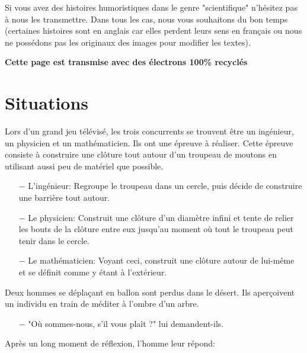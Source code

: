 Si vous avez des histoires humoristiques dans le genre "scientifique" n'hésitez pas à nous les transmettre. Dans tous les cas, nous vous souhaitons du bon temps (certaines histoires sont en anglais car elles perdent leurs sens en français ou nous ne possédons pas les originaux des images pour modifier les textes).
	
\begin{center}
\textbf{Cette page est transmise avec des électrons 100\% recyclés}
\end{center}

	\section{Situations}
	
	Lors d'un grand jeu télévisé, les trois concurrents se trouvent être un ingénieur, un physicien et un mathématicien. Ils ont une épreuve à réaliser. Cette épreuve consiste à construire une clôture tout autour d'un troupeau de moutons en utilisant aussi peu de matériel que possible.

\begin{itemize}	 
	\item[$-$] L'ingénieur: Regroupe le troupeau dans un cercle, puis décide de construire une barrière tout autour.

	\item[$-$] Le physicien: Construit une clôture d'un diamètre infini et tente de relier les bouts de la clôture entre eux jusqu'au moment où tout le troupeau peut tenir dans le cercle.

	\item[$-$] Le mathématicien: Voyant ceci, construit une clôture autour de lui-même et se définit comme y étant à l'extérieur.
\end{itemize}

\begin{center}\underline{\hspace{5 cm}}\end{center}

Deux hommes se déplaçant en ballon sont perdus dans le désert. Ils aperçoivent un individu en train de méditer à l'ombre d'un arbre.

\begin{itemize}	 
	\item[$-$] "Où sommes-nous, s'il vous plaît ?" lui demandent-ils.
\end{itemize}

Après un long moment de réflexion, l'homme leur répond:

